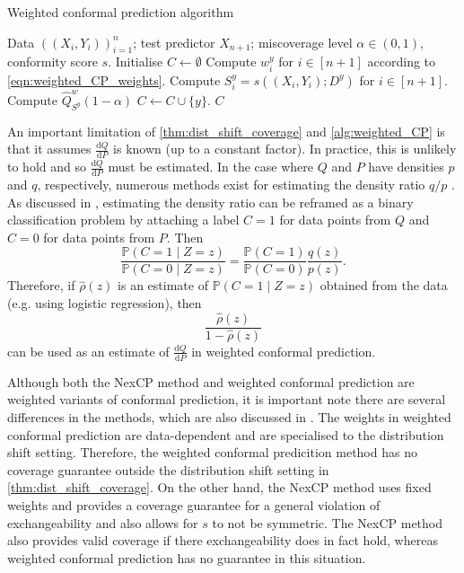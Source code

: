 \documentclass[11pt, titlepage]{article} %
\newcommand{\R}{\mathrm}
\newcommand{\Prob}[1]{\mathbb{P}\left( #1 \right)}
\numberwithin{equation}{section}
\theoremstyle{definition}
\numberwithin{theorem}{section}
\numberwithin{lemma}{section}
\numberwithin{corollary}{section}
\numberwithin{proposition}{section}
\numberwithin{definition}{section}
\numberwithin{remark}{section}
\begin{document}
\begin{algorithm}[H]
    \caption{Weighted conformal prediction algorithm}
    \label{alg:weighted_CP}
    \begin{algorithmic}
        \Require Data \(((X_i, Y_i))_{i=1}^n\); test predictor \(X_{n+1}\); miscoverage level \(\alpha \in (0,1)\), conformity score \(s\).
        \State Initialise \(C \gets \emptyset\)       
            \State Compute \(w_i^y\) for \(i \in [n+1]\) according to \eqref{eqn:weighted_CP_weights}.
            \State Compute \(S_i^y = s((X_i, Y_i); D^y)\) for \(i \in [n+1]\).
            \State Compute \(\hat{Q}^w_{S^y}(1-\alpha)\)
                \State \(C \gets C \cup \{y\} \).
            \EndIf      
        \EndFor
        \Ensure \(C\)
    \end{algorithmic}
\end{algorithm}

\noindent
An important limitation of \cref{thm:dist_shift_coverage} and \cref{alg:weighted_CP} is that it assumes \(\frac{\R{d}Q}{\R{d}P}\) is known (up to a constant factor). In practice, this is unlikely to hold and so \(\frac{\R{d}Q}{\R{d}P}\) must be estimated. In the case where \(Q\) and \(P\) have densities \(p\) and \(q\), respectively, numerous methods exist for estimating the density ratio \(q/p\) \cite{sugiyama2012density}. As discussed in \cite{tibshirani2019covariateshift}, estimating the density ratio can be reframed as a binary classification problem by attaching a label \(C = 1\) for data points from \(Q\) and \(C = 0\) for data points from \(P\). Then \[\frac{\Prob{C = 1 \mid Z = z}}{\Prob{C = 0 \mid Z = z}} = \frac{\Prob{C = 1}}{\Prob{C = 0}} \frac{q(z)}{p(z)}.\] Therefore, if \(\hat{\rho}(z)\) is an estimate of \(\Prob{C = 1 \mid Z = z}\) obtained from the data (e.g. using logistic regression), then \[\frac{\hat{\rho}(z)}{1-\hat{\rho}(z)}\] can be used as an estimate of \(\frac{\R{d}Q}{\R{d}P}\) in weighted conformal prediction. \vskip5pt

\noindent
Although both the NexCP method and weighted conformal prediction are weighted variants of conformal prediction, it is important note there are several differences in the methods, which are also discussed in \cite{barber2023conformalbeyondexch}. The weights in weighted conformal prediction are data-dependent and are specialised to the distribution shift setting. Therefore, the weighted conformal predicition method has no coverage guarantee outside the distribution shift setting in \cref{thm:dist_shift_coverage}. On the other hand, the NexCP method uses fixed weights and provides a coverage guarantee for a general violation of exchangeability and also allows for \(s\) to not be symmetric. The NexCP method also provides valid coverage if there exchangeability does in fact hold, whereas weighted conformal prediction has no guarantee in this situation.
\end{document}
